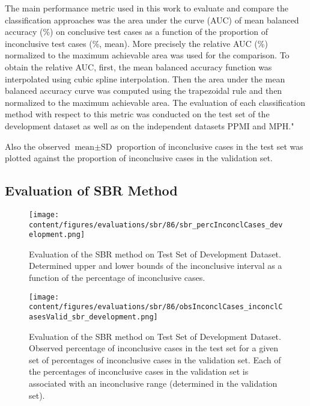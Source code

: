 
The main performance metric used in this work to evaluate and compare the classification approaches was 
the area under the curve (AUC) of mean balanced accuracy (\%) on conclusive test cases as a function of 
the proportion of inconclusive test cases (\%, mean).
More precisely the relative AUC (\%) normalized to the maximum achievable area was used for the comparison.
To obtain the relative AUC, 
first, the mean balanced accuracy function was interpolated using cubic spline interpolation.
Then the area under the mean balanced accuracy curve was computed using the trapezoidal rule 
and then normalized to the maximum achievable area.
The evaluation of each classification method with respect to this metric was conducted on the test set of the 
development dataset as well as on the independent datasets PPMI and MPH."


Also the observed $\text{mean} \pm \text{SD}$ proportion of inconclusive cases in the test set was plotted 
against the proportion of inconclusive cases in the validation set.



\subsection{Evaluation of SBR Method}
\label{subsec:eval_sbr}



\begin{figure}[t]
    \centering
    \texttt{[image: content/figures/evaluations/sbr/86/sbr\_percInconclCases\_development.png]}
    \caption{Evaluation of the SBR method on Test Set of Development Dataset. 
    Determined upper and lower bounds of the inconclusive interval as a function of the percentage of inconclusive cases.} 
    \label{fig:sbr_percInconclCases_development}
\end{figure}


\begin{figure}[h]
    \centering
    \texttt{[image: content/figures/evaluations/sbr/86/obsInconclCases\_inconclCasesValid\_sbr\_development.png]}
    \caption{Evaluation of the SBR method on Test Set of Development Dataset.
    Observed percentage of inconclusive cases in the test set 
    for a given set of percentages of inconclusive cases in the validation set.
    Each of the percentages of inconclusive cases in the validation set is associated 
    with an inconclusive range (determined in the validation set).} 
    \label{fig:obsInconclCases_inconclCasesValid_sbr_development}
\end{figure} 


